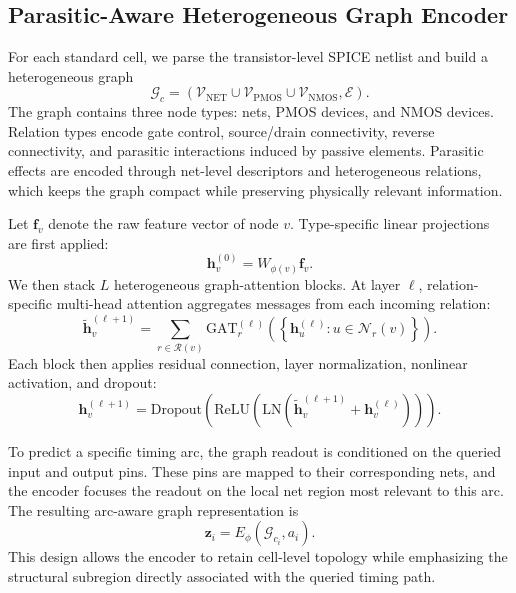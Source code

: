 \documentclass[10pt,a4paper]{article}
\begin{document}
\subsection{Parasitic-Aware Heterogeneous Graph Encoder}

For each standard cell, we parse the transistor-level SPICE netlist and build a heterogeneous graph
\begin{equation}
    \mathcal{G}_c = \left(\mathcal{V}_{\mathrm{NET}} \cup \mathcal{V}_{\mathrm{PMOS}} \cup \mathcal{V}_{\mathrm{NMOS}}, \mathcal{E}\right).
\end{equation}
The graph contains three node types: nets, PMOS devices, and NMOS devices. Relation types encode gate control, source/drain connectivity, reverse connectivity, and parasitic interactions induced by passive elements. Parasitic effects are encoded through net-level descriptors and heterogeneous relations, which keeps the graph compact while preserving physically relevant information.

Let $\mathbf{f}_v$ denote the raw feature vector of node $v$. Type-specific linear projections are first applied:
\begin{equation}
    \mathbf{h}_v^{(0)} = W_{\phi(v)} \mathbf{f}_v.
\end{equation}
We then stack $L$ heterogeneous graph-attention blocks. At layer $\ell$, relation-specific multi-head attention aggregates messages from each incoming relation:
\begin{equation}
    \tilde{\mathbf{h}}_v^{(\ell+1)} =
    \sum_{r \in \mathcal{R}(v)}
    \mathrm{GAT}_r^{(\ell)}
    \left(
        \left\{\mathbf{h}_u^{(\ell)}: u \in \mathcal{N}_r(v)\right\}
    \right).
\end{equation}
Each block then applies residual connection, layer normalization, nonlinear activation, and dropout:
\begin{equation}
    \mathbf{h}_v^{(\ell+1)} =
    \mathrm{Dropout}
    \left(
        \mathrm{ReLU}
        \left(
            \mathrm{LN}
            \left(
                \tilde{\mathbf{h}}_v^{(\ell+1)} + \mathbf{h}_v^{(\ell)}
            \right)
        \right)
    \right).
\end{equation}

To predict a specific timing arc, the graph readout is conditioned on the queried input and output pins. These pins are mapped to their corresponding nets, and the encoder focuses the readout on the local net region most relevant to this arc. The resulting arc-aware graph representation is
\begin{equation}
    \mathbf{z}_i = E_{\phi}\left(\mathcal{G}_{c_i}, a_i\right).
\end{equation}
This design allows the encoder to retain cell-level topology while emphasizing the structural subregion directly associated with the queried timing path.
\end{document}
